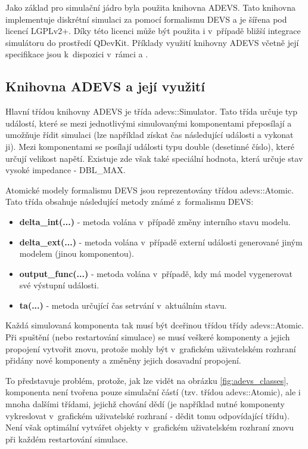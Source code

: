Jako základ pro simulační jádro byla použita knihovna ADEVS. Tato knihovna implementuje diskrétní simulaci za pomocí formalismu DEVS a je šířena pod licencí LGPLv2+. Díky této licenci může být použita i v~případě bližší integrace simulátoru do prostředí QDevKit. Příklady využití knihovny ADEVS včetně její specifikace jsou k~dispozici v~rámci \cite{nutaro} a \cite{adevs}.

\subsection{Knihovna ADEVS a její využití}

Hlavní třídou knihovny ADEVS je třída adevs::Simulator. Tato třída určuje typ událostí, které se mezi jednotlivými simulovanými komponentami přeposílají a umožňuje řídit simulaci (lze například získat čas následující události a vykonat ji). Mezi komponentami se posílají události typu double (desetinné číslo),  které určují velikost napětí. Existuje zde však také speciální hodnota, která určuje stav vysoké impedance - DBL\_MAX.

Atomické modely formalismu DEVS jsou reprezentovány třídou adevs::Atomic. Tato třída obsahuje následující metody známé z~formalismu DEVS:

\begin{itemize}
\item \textbf{delta\_int(...)} - metoda volána v~případě změny interního stavu modelu.
\item \textbf{delta\_ext(...)} - metoda volána v~případě externí události generované jiným modelem (jinou komponentou).
\item \textbf{output\_func(...)} - metoda volána v~případě, kdy má model vygenerovat své výstupní události.
\item \textbf{ta(...)} - metoda určující čas setrvání v~aktuálním stavu.
\end{itemize}

Každá simulovaná komponenta tak musí být dceřinou třídou třídy adevs::Atomic. Při spuštění (nebo restartování simulace) se musí veškeré komponenty a jejich propojení vytvořit znovu, protože mohly být v~grafickém uživatelském rozhraní přidány nové komponenty a změněny jejich dosavadní propojení.

To představuje problém, protože, jak lze vidět na obrázku \ref{fig:adevs_classes}, komponenta není tvořena pouze simulační částí (tzv. třídou adevs::Atomic), ale i mnoha dalšími třídami, jejichž chování dědí (je například nutné komponenty vykreslovat v~grafickém uživatelské rozhraní - dědit tomu odpovídající třídu). Není však optimální vytvářet objekty v~grafickém uživatelském rozhraní znovu při každém restartování simulace.

